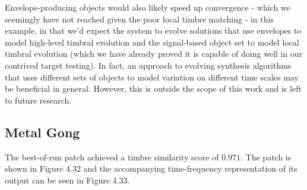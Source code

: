 \documentclass[a4paper,12pt]{report} 	%
\numberwithin{figure}{chapter}
\numberwithin{table}{chapter}
\numberwithin{equation}{chapter}
\begin{document}
\begin{flushleft}
Envelope-producing objects would also likely speed up convergence - which we seemingly have not reached given the poor local timbre matching - in this example, in that we'd expect the system to evolve solutions that use envelopes to model high-level timbral evolution and the signal-based object set to model local timbral evolution (which we have already proved it is capable of doing well in our contrived target testing). In fact, an approach to evolving synthesis algorithms that uses different sets of objects to model variation on different time scales may be beneficial in general. However, this is outside the scope of this work and is left to future research.

\clearpage
\subsection{Metal Gong}

The best-of-run patch achieved a timbre similarity score of $0.971$. The patch is shown in Figure 4.32 and the accompanying time-frequency representation of its output can be seen in Figure 4.33.


\end{flushleft}
\end{document}
